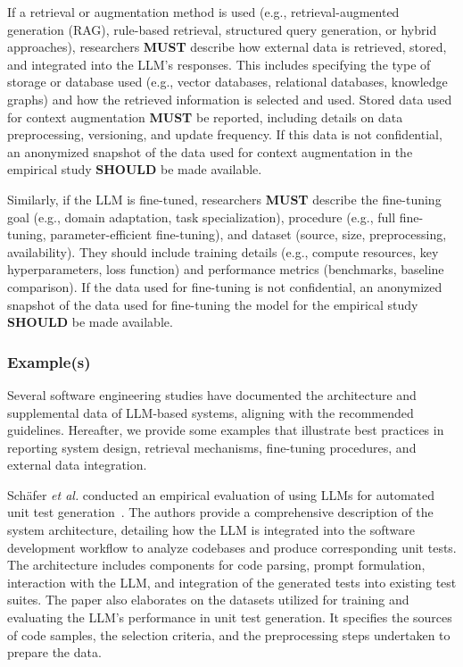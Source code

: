 \documentclass[11pt]{article}
\newcommand{\must}{\textbf{MUST}\xspace}
\newcommand{\should}{\textbf{SHOULD}\xspace}
\begin{document}

If a retrieval or augmentation method is used (e.g., retrieval-augmented generation (RAG), rule-based retrieval, structured query generation, or hybrid approaches), researchers \must describe how external data is retrieved, stored, and integrated into the LLM's responses. This includes specifying the type of storage or database used (e.g., vector databases, relational databases, knowledge graphs) and how the retrieved information is selected and used. Stored data used for context augmentation \must be reported, including details on data preprocessing, versioning, and update frequency. If this data is not confidential, an anonymized snapshot of the data used for context augmentation in the empirical study \should be made available.

Similarly, if the LLM is fine-tuned, researchers \must describe the fine-tuning goal (e.g., domain adaptation, task specialization), procedure (e.g., full fine-tuning, parameter-efficient fine-tuning), and dataset (source, size, preprocessing, availability). They should include training details (e.g., compute resources, key hyperparameters, loss function) and performance metrics (benchmarks, baseline comparison). If the data used for fine-tuning is not confidential, an anonymized snapshot of the data used for fine-tuning the model for the empirical study \should be made available.

\subsubsection{Example(s)}

Several software engineering studies have documented the architecture and supplemental data of LLM-based systems, aligning with the recommended guidelines. Hereafter, we provide some examples that illustrate best practices in reporting system design, retrieval mechanisms, fine-tuning procedures, and external data integration.


Sch{\"{a}}fer \textit{et al.} conducted an empirical evaluation of using LLMs for automated unit test generation~\cite{DBLP:journals/tse/SchaferNET24}. The authors provide a comprehensive description of the system architecture, detailing how the LLM is integrated into the software development workflow to analyze codebases and produce corresponding unit tests. The architecture includes components for code parsing, prompt formulation, interaction with the LLM, and integration of the generated tests into existing test suites. The paper also elaborates on the datasets utilized for training and evaluating the LLM's performance in unit test generation. It specifies the sources of code samples, the selection criteria, and the preprocessing steps undertaken to prepare the data.
\end{document}
